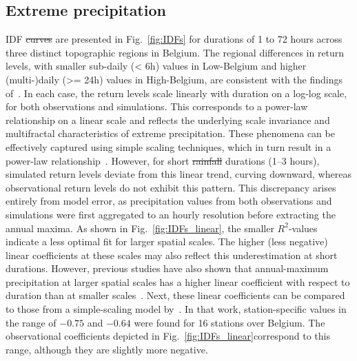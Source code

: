 \documentclass[journal abbreviation, manuscript]{copernicus}
\providecommand{\DIFadd}[1]{{\protect\color{blue}\uwave{#1}}} %
\providecommand{\DIFdel}[1]{{\protect\color{red}\sout{#1}}} %
\providecommand{\DIFaddbegin}{} %
\providecommand{\DIFaddend}{} %
\providecommand{\DIFdelbegin}{} %
\providecommand{\DIFdelend}{} %
\begin{document}
\subsection{Extreme precipitation}

IDF \DIFdelbegin \DIFdel{curves }\DIFdelend \DIFaddbegin \DIFadd{statistics }\DIFaddend are presented in Fig.~\ref{fig:IDFs} for durations of 1 to 72 hours across three distinct topographic regions in Belgium.
The regional differences in return levels, with smaller sub-daily (< 6h) values in Low-Belgium and higher (multi-)daily (>= 24h) values in High-Belgium, are consistent with the findings of~\citet{van_de_vyver_practical_2013}.
In each case, the return levels scale linearly with duration on a log-log scale, for both observations and simulations.
This corresponds to a power-law relationship on a linear scale and reflects the underlying scale invariance and multifractal characteristics of extreme precipitation.
These phenomena can be effectively captured using simple scaling techniques, which in turn result in a power-law relationship~\citep{gupta_multiscaling_1990, veneziano_multifractality_2002}.
However, for short \DIFdelbegin \DIFdel{rainfall }\DIFdelend \DIFaddbegin \DIFadd{precipitation }\DIFaddend durations (1--3 hours), simulated return levels deviate from this linear trend, curving downward, whereas observational return levels do not exhibit this pattern.
This discrepancy arises entirely from model error, as precipitation values from both observations and simulations were first aggregated to an hourly resolution before extracting the annual maxima.
As shown in Fig.~\ref{fig:IDFs_linear}\DIFaddbegin \DIFadd{b}\DIFaddend , the smaller $R^2$-values indicate a less optimal fit for larger spatial scales.
The higher (less negative) linear coefficients at these scales may also reflect this underestimation at short durations.
However, previous studies have also shown that annual-maximum precipitation at larger spatial scales has a higher linear coefficient with respect to duration than at smaller scales~\citep{innocenti_observed_2019}.
Next, these linear coefficients can be compared to those from a simple-scaling model by~\citet{van_de_vyver_multiscalingbased_2018}.
In that work, station-specific values in the range of $-0.75$ and $-0.64$ were found for 16 stations over Belgium.
The observational coefficients depicted in Fig.~\ref{fig:IDFs_linear}\DIFaddbegin \DIFadd{a }\DIFaddend correspond to this range, although they are slightly more negative.
\end{document}
